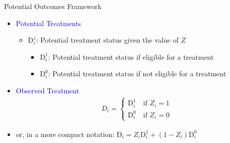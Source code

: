 \documentclass[dvipsnames,hyperref={pdfpagelabels=false}]{beamer}
\begin{document}
\begin{frame}{Potential Outcomes Framework}
	\begin{itemize}
		
		\item \textcolor{blue}{Potential Treatments}
		\vspace{0.2cm}
		\begin{itemize}
			\item $\mathrm{D}^{z}_{i}$: Potential treatment status given the value of $Z$
			\vspace{0.2cm}
					\begin{itemize}
			\item $\mathrm{D}^{1}_{i}$: Potential treatment status if eligible for a treatment 
						\vspace{0.2cm}
					
			\vspace{0.2cm}
			\item $\mathrm{D}^{0}_{i}$: Potential treatment status if not eligible for a treatment 
			\vspace{0.2cm}
					\end{itemize}
			
		\end{itemize}
		\vspace{0.2cm}
		\item \textcolor{blue}{Observed Treatment}
		\begin{align*}
		D_{i}=\left\lbrace
		\begin{array}{l}
		\mathrm{D}^{1}_{i}\quad \text{if $Z_{i}=1$} \\
		\mathrm{D}^{0}_{i}\quad \text{if $Z_{i}=0$}
		\end{array}\right.
		\end{align*}
		\item or, in a more compact notation: 
		$\mathrm{D}_{i}=Z_{i}\mathrm{D}^{1}_{i}+(1-Z_{i})\mathrm{D}^{0}_{i} $
		
	\end{itemize}
\end{frame}
\end{document}
